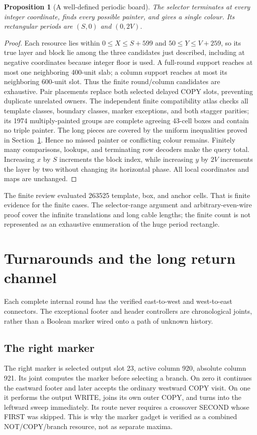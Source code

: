\documentclass[11pt,letterpaper]{article}
\newtheorem{proposition}[theorem]{Proposition}
\theoremstyle{definition}\newtheorem{definition}[theorem]{Definition}
\theoremstyle{remark}\newtheorem{remark}[theorem]{Remark}
\begin{document}
\begin{proposition}[A well-defined periodic board]\label{ptr:la:prop:board}
The selector terminates at every integer coordinate, finds every possible painter, and gives a single colour. Its rectangular periods are $(S,0)$ and $(0,2V)$.
\end{proposition}
\begin{proof}
Each resource lies within $0\le X\le S+599$ and $50\le Y\le V+259$, so its true layer and block lie among the three candidates just described, including at negative coordinates because integer floor is used. A full-round support reaches at most one neighboring 400-unit slab; a column support reaches at most its neighboring 600-unit slot. Thus the finite round/column candidates are exhaustive. Pair placements replace both selected delayed COPY slots, preventing duplicate unrelated owners. The independent finite compatibility atlas checks all template classes, boundary classes, marker exceptions, and both stagger parities; its 1974 multiply-painted groups are complete agreeing 43-cell boxes and contain no triple painter. The long pieces are covered by the uniform inequalities proved in Section~\ref{ptr:la:sec:channel}. Hence no missed painter or conflicting colour remains. Finitely many comparisons, lookups, and terminating row decoders make the query total. Increasing $x$ by $S$ increments the block index, while increasing $y$ by $2V$ increments the layer by two without changing its horizontal phase. All local coordinates and maps are unchanged.
\end{proof}
The finite review evaluated 263525 template, box, and anchor cells. That is finite evidence for the finite cases. The selector-range argument and arbitrary-even-wire proof cover the infinite translations and long cable lengths; the finite count is not represented as an exhaustive enumeration of the huge period rectangle.

\section{Turnarounds and the long return channel}\label{ptr:la:sec:channel}
Each complete internal round has the verified east-to-west and west-to-east connectors. The exceptional footer and header controllers are chronological joints, rather than a Boolean marker wired onto a path of unknown history.

\subsection{The right marker}
The right marker is selected output slot 23, active column 920, absolute column 921. Its joint computes the marker before selecting a branch. On zero it continues the eastward footer and later accepts the ordinary westward COPY visit. On one it performs the output WRITE, joins its own outer COPY, and turns into the leftward sweep immediately. Its route never requires a crossover SECOND whose FIRST was skipped. This is why the marker gadget is verified as a combined NOT/COPY/branch resource, not as separate maxima.
\end{document}
